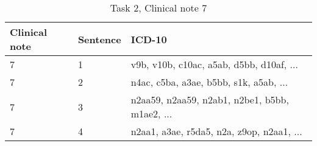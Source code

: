 \begin{table}[!htb] \footnotesize \center
\caption{Task 2, Clinical note 7 \label{tab:t2c7}}
\begin{tabularx}{\textwidth}{l l X}
    \toprule
    Clinical note & Sentence & ICD-10 \\
    \midrule
	 7 & 1 & v9b, v10b, c10ac, a5ab, d5bb, d10af, ... \\
	 7 & 2 & n4ac, c5ba, a3ae, b5bb, s1k, a5ab, ... \\
	 7 & 3 & n2aa59, n2aa59, n2ab1, n2be1, b5bb, m1ae2, ... \\
	 7 & 4 & n2aa1, a3ae, r5da5, n2a, z9op, n2aa1, ... \\
	\bottomrule
\end{tabularx}
\end{table}